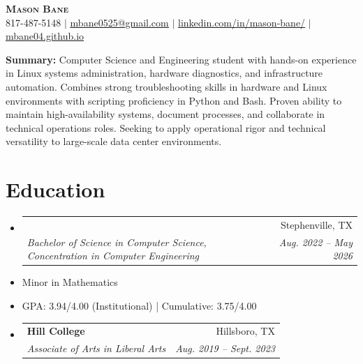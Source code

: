\documentclass[letterpaper,11pt]{article}
\makeatletter
\newcommand{\educationDetail}[1]{%
  \vspace{-4pt}\item[]\small{#1}\vspace{-2pt}%
}
\newcommand{\resumeSubheading}[4]{
  \vspace{-2pt}\item
    \begin{tabular*}{0.97\textwidth}[t]{l@{\extracolsep{\fill}}r}
      \textbf{#1} & #2 \\
      \textit{\small#3} & \textit{\small #4} \\
    \end{tabular*}\vspace{-7pt}
}
\newcommand{\resumeSubHeadingListStart}{\begin{itemize}[leftmargin=0.15in, label={}]}
\newcommand{\resumeSubHeadingListEnd}{\end{itemize}}
\makeatother
\begin{document}

\begin{center}
    \textbf{\Huge \scshape Mason Bane} \\ \vspace{1pt}
    \small 817-487-5148 $|$ \href{mailto:mbane0525@gmail.com}{\underline{mbane0525@gmail.com}} $|$ 
    \href{https://www.linkedin.com/in/mason-bane/}{\underline{linkedin.com/in/mason-bane/}} $|$
    \href{https://mbane04.github.io}{\underline{mbane04.github.io}}
\end{center}


\vspace{-2pt}
\textbf{Summary:} Computer Science and Engineering student with hands-on experience in Linux systems administration, hardware diagnostics, and infrastructure automation. Combines strong troubleshooting skills in hardware and Linux environments with scripting proficiency in Python and Bash. Proven ability to maintain high-availability systems, document processes, and collaborate in technical operations roles. Seeking to apply operational rigor and technical versatility to large-scale data center environments.
\vspace{-10pt}

\section{Education}
  \resumeSubHeadingListStart
    \resumeSubheading
      {Tarleton State University \textnormal}{Stephenville, TX}
      {Bachelor of Science in Computer Science, Concentration in Computer Engineering}
      {Aug. 2022 -- May 2026}
      \educationDetail{Minor in Mathematics}
      \educationDetail{GPA: 3.94/4.00 (Institutional) | Cumulative: 3.75/4.00}
   \resumeSubheading
      {Hill College}{Hillsboro, TX}
      {Associate of Arts in Liberal Arts}{Aug. 2019 -- Sept. 2023}
  \resumeSubHeadingListEnd
  \vspace{-13pt}
\end{document}
